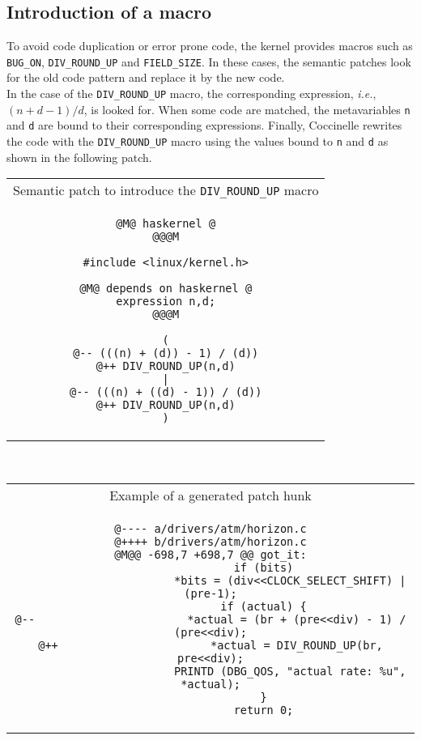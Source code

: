\newpage
\subsection{Introduction of a macro}

To avoid code duplication or error prone code, the kernel provides
macros such as \texttt{BUG\_ON}, \texttt{DIV\_ROUND\_UP} and
\texttt{FIELD\_SIZE}. In these cases, the semantic patches look for
the old code pattern and replace it by the new code.\\

In the case of the \texttt{DIV\_ROUND\_UP} macro, the corresponding
expression, \emph{i.e.}, $(n + d - 1) / d$, is looked for. When some
code are matched, the metavariables \texttt{n} and \texttt{d} are
bound to their corresponding expressions. Finally, Coccinelle rewrites
the code with the \texttt{DIV\_ROUND\_UP} macro using the values bound
to \texttt{n} and \texttt{d} as shown in the following patch.\\

\begin{tabular}{c}
Semantic patch to introduce the \texttt{DIV\_ROUND\_UP} macro\\
\begin{lstlisting}[language=Cocci,name=divround]
@M@ haskernel @
@@@M

#include <linux/kernel.h>

@M@ depends on haskernel @
expression n,d;
@@@M

(
@-- (((n) + (d)) - 1) / (d))
@++ DIV_ROUND_UP(n,d)
|
@-- (((n) + ((d) - 1)) / (d))
@++ DIV_ROUND_UP(n,d)
)
\end{lstlisting}
\end{tabular}\\

\vspace{1cm}

\begin{tabular}{c}
Example of a generated patch hunk\\
\begin{lstlisting}[language=PatchC]
@---- a/drivers/atm/horizon.c
@++++ b/drivers/atm/horizon.c
@M@@ -698,7 +698,7 @@ got_it:
                if (bits)
                        *bits = (div<<CLOCK_SELECT_SHIFT) | (pre-1);
                if (actual) {
@--                       *actual = (br + (pre<<div) - 1) / (pre<<div);
@++                       *actual = DIV_ROUND_UP(br, pre<<div);
                        PRINTD (DBG_QOS, "actual rate: %u", *actual);
                }
                return 0;
\end{lstlisting}
\end{tabular}\\

